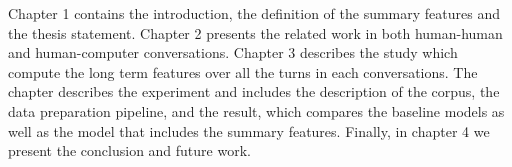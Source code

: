 Chapter 1 contains the introduction, the definition of the summary features and the thesis statement. Chapter 2 presents the related work in both human-human and human-computer conversations. Chapter 3 describes the study which compute the long term features over all the turns in each conversations. The chapter describes the experiment and includes the description of the corpus, the data preparation pipeline, and the result, which compares the baseline models as well as the model that includes the summary features. Finally, in chapter 4 we present the conclusion and future work.
